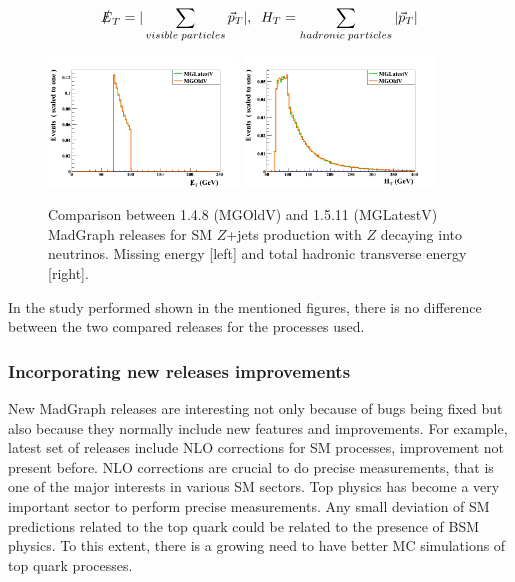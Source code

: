 \begin{equation}
  \label{eq:METHT}
  \slashed{E}_{T}=|\sum_{visible\; particles}\vec{p}_{T}|, \; \; H_{T}=\sum_{hadronic\; particles}|\vec{p}_{T}|
\end{equation}

\begin{figure}[!Hhtbp]
  \begin{center}
    \includegraphics[width=0.45\textwidth]{figs/ZjetsRelVal8.png}
    \includegraphics[width=0.45\textwidth]{figs/ZjetsRelVal9.png}
    \caption{Comparison between 1.4.8 (MGOldV) and 1.5.11 (MGLatestV) MadGraph releases for SM $Z$+jets production with $Z$ decaying into neutrinos. Missing energy [left] and total hadronic transverse energy [right].}
    \label{fig:ZRelVal2}
  \end{center}
\end{figure}

In the study performed shown in the mentioned figures, there is no difference between the two compared releases for the processes used.

\subsubsection{Incorporating new releases improvements}

New MadGraph releases are interesting not only because of bugs being fixed but also because they normally include new features and improvements. For example, latest set of releases include NLO corrections for SM processes, improvement not present before. NLO corrections are crucial to do precise measurements, that is one of the major interests in various SM sectors. Top physics has become a very important sector to perform precise measurements. Any small deviation of SM predictions related to the top quark could be related to the presence of BSM physics. To this extent, there is a growing need to have better MC simulations of top quark processes.

